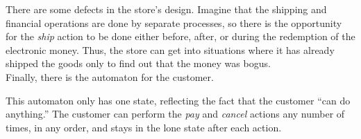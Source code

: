 \documentclass[]{article}
\begin{document}
      
    There are some defects in the store's design. Imagine that the shipping
    and financial operations are done by separate processes, so there is the
    opportunity for the \emph{ship} action to be done either before, after, or
    during the redemption of the electronic money. Thus, the store can get
    into situations where it has already shipped the goods only to find out
    that the money was bogus. \\
    \indent Finally, there is the automaton for the customer.
    
    
    This automaton only has one state, reflecting the fact that the customer
    ``can do anything.'' The customer can perform the \emph{pay} and
    \emph{cancel} actions any number of times, in any order, and stays in the
    lone state after each action.
    
\end{document}

